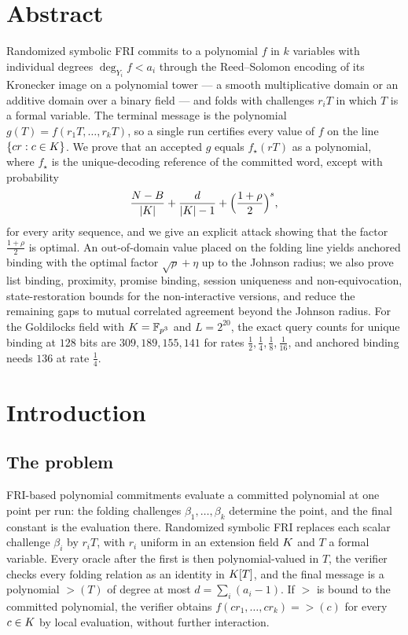 \chapter*{Abstract}

Randomized symbolic FRI commits to a polynomial $f$ in $k$ variables with individual
degrees $\deg_{Y_i}f<a_i$ through the Reed--Solomon encoding of its Kronecker image on a
polynomial tower --- a smooth multiplicative domain or an additive domain over a binary
field --- and folds with challenges $r_iT$ in which $T$ is a formal variable. The terminal message is the polynomial
$g(T)=f(r_1T,\dots,r_kT)$, so a single run certifies every value of $f$ on the line
$\{cr:c\in K\}$. We prove that an accepted $g$ equals $f_\star(rT)$ as a polynomial, where
$f_\star$ is the unique-decoding reference of the committed word, except with probability
\[
\frac{N-B}{|K|}+\frac{d}{|K|-1}+\Bigl(\frac{1+\rho}2\Bigr)^{s},
\]
for every arity sequence, and we give an explicit attack showing that the factor
$\frac{1+\rho}2$ is optimal. An out-of-domain value placed on the folding line yields
anchored binding with the optimal factor $\sqrt\rho+\eta$ up to the Johnson radius; we also
prove list binding, proximity, promise binding, session uniqueness and non-equivocation,
state-restoration bounds for the non-interactive versions, and reduce the remaining gaps to
mutual correlated agreement beyond the Johnson radius. For the Goldilocks field
with $K=\mathbb{F}_{p^3}$ and $L=2^{20}$, the exact query counts for unique binding at $128$ bits
are $309,189,155,141$ for rates $\frac12,\frac14,\frac18,\frac1{16}$, and anchored binding
needs $136$ at rate $\frac14$.

\chapter*{Introduction}

\section*{The problem}

FRI-based polynomial commitments evaluate a committed polynomial at one point per run:
the folding challenges $\beta_1,\dots,\beta_k$ determine the point, and the final constant
is the evaluation there. Randomized symbolic FRI replaces each scalar challenge $\beta_i$
by $r_iT$, with $r_i$ uniform in an extension field $K$ and $T$ a formal variable. Every
oracle after the first is then polynomial-valued in $T$, the verifier checks every folding
relation as an identity in $K[T]$, and the final message is a polynomial
$\gt(T)$ of degree at most $d=\sum_i(a_i-1)$. If $\gt$ is bound to the committed
polynomial, the verifier obtains $f(cr_1,\dots,cr_k)=\gt(c)$ for every $c\in K$ by local
evaluation, without further interaction.

